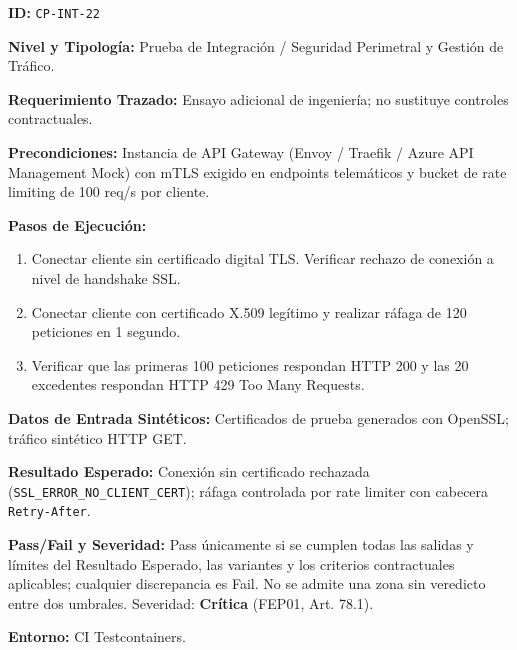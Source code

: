 \par\noindent\textbf{ID:} \texttt{C\allowbreak{}P\allowbreak{}-\allowbreak{}I\allowbreak{}N\allowbreak{}T\allowbreak{}-\allowbreak{}2\allowbreak{}2\allowbreak{}}\par
\par\noindent\textbf{Nivel y Tipología:} Prueba de Integración / Seguridad Perimetral y Gestión de Tráfico.\par
\par\noindent\textbf{Requerimiento Trazado:} Ensayo adicional de ingeniería; no sustituye controles contractuales.\par
\par\noindent\textbf{Precondiciones:} Instancia de API Gateway (Envoy / Traefik / Azure API Management Mock) con mTLS exigido en endpoints telemáticos y bucket de rate limiting de 100 req/s por cliente.\par
\par\noindent\textbf{Pasos de Ejecución:} \par
\begin{enumerate}
\item Conectar cliente sin certificado digital TLS. Verificar rechazo de conexión a nivel de handshake SSL.
\item Conectar cliente con certificado X.509 legítimo y realizar ráfaga de 120 peticiones en 1 segundo.
\item Verificar que las primeras 100 peticiones respondan HTTP 200 y las 20 excedentes respondan HTTP 429 Too Many Requests.
\end{enumerate}
\par\noindent\textbf{Datos de Entrada Sintéticos:} Certificados de prueba generados con OpenSSL; tráfico sintético HTTP GET.\par
\par\noindent\textbf{Resultado Esperado:} Conexión sin certificado rechazada (\texttt{S\allowbreak{}S\allowbreak{}L\allowbreak{}\_\allowbreak{}E\allowbreak{}R\allowbreak{}R\allowbreak{}O\allowbreak{}R\allowbreak{}\_\allowbreak{}N\allowbreak{}O\allowbreak{}\_\allowbreak{}C\allowbreak{}L\allowbreak{}I\allowbreak{}E\allowbreak{}N\allowbreak{}T\allowbreak{}\_\allowbreak{}C\allowbreak{}E\allowbreak{}R\allowbreak{}T\allowbreak{}}); ráfaga controlada por rate limiter con cabecera \texttt{R\allowbreak{}e\allowbreak{}t\allowbreak{}r\allowbreak{}y\allowbreak{}-\allowbreak{}A\allowbreak{}f\allowbreak{}t\allowbreak{}e\allowbreak{}r\allowbreak{}}.\par
\par\noindent\textbf{Pass/Fail y Severidad:} Pass únicamente si se cumplen todas las salidas y límites del Resultado Esperado, las variantes y los criterios contractuales aplicables; cualquier discrepancia es Fail. No se admite una zona sin veredicto entre dos umbrales. Severidad: \textbf{Crítica} (FEP01, Art. 78.1).\par
\par\noindent\textbf{Entorno:} CI Testcontainers.\par






